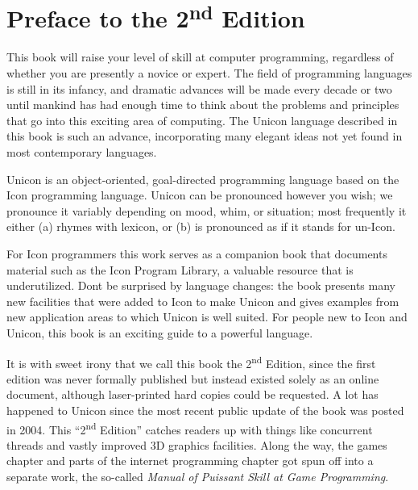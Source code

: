 \section[Preface to the 2nd Edition]{Preface to the
2\textsuperscript{nd} Edition}

This book will raise your level of skill at computer programming,
regardless of whether you are presently a novice or expert. The field
of programming languages is still in its infancy, and dramatic advances
will be made every decade or two until mankind has had enough time to
think about the problems and principles that go into this exciting area
of computing. The Unicon language described in this book is such an
advance, incorporating many elegant ideas not yet found in most
contemporary languages.

Unicon is an object-oriented, goal-directed programming language based
on the Icon programming language. Unicon can be pronounced however you
wish; we pronounce it variably depending on mood, whim, or situation;
most frequently it either (a) rhymes with
{\textquotedbl}lexicon{\textquotedbl}, or (b) is pronounced as if it
stands for {\textquotedbl}un-Icon{\textquotedbl}.

For Icon programmers this work serves as a {\textquotedbl}companion
book{\textquotedbl} that documents material such as the Icon Program
Library, a valuable resource that is underutilized.
Don{\textquotesingle}t be surprised by language changes: the book
presents many new facilities that were added to Icon to make Unicon and
gives examples from new application areas to which Unicon is well
suited. For people new to Icon and Unicon, this book is an exciting
guide to a powerful language.

It is with sweet irony that we call this book the 2\textsuperscript{nd}
Edition, since the first edition was never formally published but
instead existed solely as an online document, although laser-printed
hard copies could be requested. A lot has happened to Unicon since the
most recent public update of the book was posted in 2004. This
{\textquotedblleft}2\textsuperscript{nd} Edition{\textquotedblright}
catches readers up with things like concurrent threads and vastly
improved 3D graphics facilities. Along the way, the games chapter and
parts of the internet programming chapter got spun off into a separate
work, the so-called \textit{Manual of Puissant Skill at Game
Programming}. 

